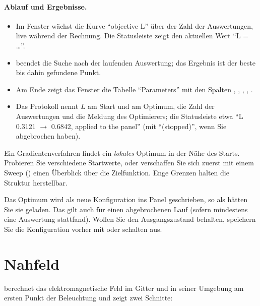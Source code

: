\paragraph{Ablauf und Ergebnisse.}
\begin{itemize}
  \item Im Fenster  wächst die Kurve \enquote{objective L} über der Zahl der Auswertungen,
    live während der Rechnung. Die Statusleiste zeigt den aktuellen Wert \enquote{L = …}.
  \item {} beendet die Suche nach der laufenden Auswertung; das Ergebnis ist der beste
    bis dahin gefundene Punkt.
  \item Am Ende zeigt das Fenster  die Tabelle \enquote{Parameters} mit den Spalten
    , , , , .
  \item Das Protokoll nennt $L$ am Start und am Optimum, die Zahl der Auswertungen und die Meldung
    des Optimierers; die Statusleiste etwa \enquote{L 0.3121 $\to$ 0.6842, applied to the panel}
    (mit \enquote{(stopped)}, wenn Sie abgebrochen haben).
\end{itemize}

\begin{tipp}
Ein Gradientenverfahren findet ein \emph{lokales} Optimum in der Nähe des Starts. Probieren Sie
verschiedene Startwerte, oder verschaffen Sie sich zuerst mit einem Sweep () einen
Überblick über die Zielfunktion. Enge Grenzen halten die Struktur herstellbar.
\end{tipp}

\begin{hinweis}
Das Optimum wird als neue Konfiguration ins Panel geschrieben, so als hätten Sie sie geladen. Das
gilt auch für einen abgebrochenen Lauf (sofern mindestens eine Auswertung stattfand). Wollen Sie den
Ausgangszustand behalten, speichern Sie die Konfiguration vorher mit  oder
schalten  aus.
\end{hinweis}

\section{Nahfeld}\label{sec:fg-nahfeld}

 berechnet das elektromagnetische Feld im Gitter und in seiner Umgebung am ersten
Punkt der Beleuchtung und zeigt zwei Schnitte:


